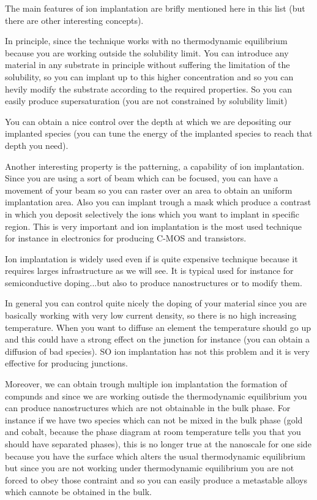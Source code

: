 \documentclass[../main/main.tex]{subfiles}
\begin{document}
The main features of ion implantation are brifly mentioned here in this list (but there are other interesting concepts).

In principle, since the technique works with no thermodynamic equilibrium because you are working  outside the solubility limit. You can introduce any material in any substrate in principle without suffering the limitation of the solubility, so you can implant up to this higher concentration and so you can hevily modify the substrate according to the required properties. So you can easily produce supersaturation (you are not constrained by solubility limit)

You can obtain a nice control over the depth at which we are depositing our implanted species (you can tune the energy of the implanted species to reach that depth you need).

Another interesting property is the patterning, a capability of ion implantation. Since you are using a sort of beam which can be focused, you can have a movement of your beam so you can raster over an area to obtain an uniform implantation area. Also you can implant trough a mask which produce a contrast in which you deposit selectively the ions which you want to implant in specific region. This is very important and ion implantation is the most used technique for instance in electronics for producing C-MOS and transistors.

Ion implantation is widely used even if is quite expensive technique because it requires larges infrastructure as we will see. It is typical used for instance for semiconductive doping...but also to produce nanostructures or to modify them.

In general you can control quite nicely the doping of your material since you are basically working with very low current density, so there is no high increasing temperature. When you want to diffuse an element the temperature should go up and this could have a strong effect on the junction for instance (you can obtain a diffusion of bad species). SO ion implantation has not this problem and it is very effective for producing junctions.

Moreover, we can obtain trough multiple ion implantation the formation of compunds and since we are working outisde the thermodynamic equilibrium you can produce nanostructures which are not obtainable in the bulk phase. For instance if we have two species which can not be mixed in the bulk phase (gold and cobalt, because the phase diagram at room temperature tells you that you should have separated phases), this is no longer true at the nanoscale for one side because you have the surface which alters the usual thermodynamic equilibrium but since you are not working under thermodynamic equilibrium you are not forced to obey those contraint and so you can easily produce a metastable alloys which cannote be obtained in the bulk.
\end{document}
